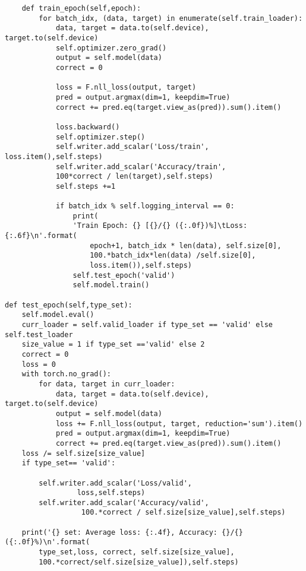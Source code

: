 \documentclass[11pt, a4paper]{article}
\begin{document}
\begin{verbatim}
    def train_epoch(self,epoch):
        for batch_idx, (data, target) in enumerate(self.train_loader):
            data, target = data.to(self.device), target.to(self.device)
            self.optimizer.zero_grad()
            output = self.model(data)
            correct = 0

            loss = F.nll_loss(output, target)
            pred = output.argmax(dim=1, keepdim=True) 
            correct += pred.eq(target.view_as(pred)).sum().item()

            loss.backward()
            self.optimizer.step()
            self.writer.add_scalar('Loss/train', loss.item(),self.steps)
            self.writer.add_scalar('Accuracy/train',
            100*correct / len(target),self.steps)
            self.steps +=1

            if batch_idx % self.logging_interval == 0:
                print(
                'Train Epoch: {} [{}/{} ({:.0f})%]\tLoss: {:.6f}\n'.format(
                    epoch+1, batch_idx * len(data), self.size[0],
                    100.*batch_idx*len(data) /self.size[0],
                    loss.item()),self.steps)
                self.test_epoch('valid')
                self.model.train()

def test_epoch(self,type_set):
    self.model.eval()
    curr_loader = self.valid_loader if type_set == 'valid' else self.test_loader
    size_value = 1 if type_set =='valid' else 2
    correct = 0
    loss = 0
    with torch.no_grad():
        for data, target in curr_loader:
            data, target = data.to(self.device), target.to(self.device)
            output = self.model(data)
            loss += F.nll_loss(output, target, reduction='sum').item()
            pred = output.argmax(dim=1, keepdim=True) 
            correct += pred.eq(target.view_as(pred)).sum().item()
    loss /= self.size[size_value]
    if type_set== 'valid':

        self.writer.add_scalar('Loss/valid',
                 loss,self.steps)
        self.writer.add_scalar('Accuracy/valid',
                  100.*correct / self.size[size_value],self.steps)

    print('{} set: Average loss: {:.4f}, Accuracy: {}/{} ({:.0f}%)\n'.format(
        type_set,loss, correct, self.size[size_value],
        100.*correct/self.size[size_value]),self.steps)


\end{verbatim}
\\\\
\end{document}

